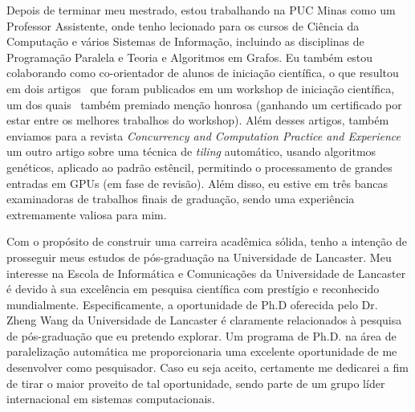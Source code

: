 \documentclass{article}
\begin{document}
Depois de terminar meu mestrado, estou trabalhando na PUC Minas como um
Professor Assistente, onde tenho lecionado para os cursos de Ci\^{e}ncia da
Computa\c{c}\~{a}o e v\'{a}rios Sistemas de Informa\c{c}\~{a}o, incluindo as
disciplinas de Programa\c{c}\~{a}o Paralela e Teoria e Algoritmos em Grafos. Eu
tamb\'{e}m estou colaborando como co-orientador de alunos de inicia\c{c}\~{a}o
cient\'{i}fica, o que resultou em dois
artigos~\cite{saffran2015apriori,pereira2015stencilbench} que foram publicados
em um workshop de inicia\c{c}\~{a}o cient\'{i}fica, um dos
quais~\cite{pereira2015stencilbench} tamb\'{e}m premiado men\c{c}\~{a}o honrosa
(ganhando um certificado por estar entre os melhores trabalhos do workshop).
Al\'{e}m desses artigos, tamb\'{e}m enviamos para a revista {\em Concurrency
and Computation Practice and Experience} um outro artigo sobre uma t\'{e}cnica
de {\em tiling} autom\'{a}tico, usando algoritmos gen\'{e}ticos, aplicado ao
padr\~{a}o est\^{e}ncil, permitindo o processamento de grandes entradas em GPUs
(em fase de revis\~{a}o).  Al\'{e}m disso, eu estive em tr\^{e}s bancas
examinadoras de trabalhos finais de gradua\c{c}\~{a}o, sendo uma
experi\^{e}ncia extremamente valiosa para mim.

Com o prop\'{o}sito de construir uma carreira acad\^{e}mica s\'{o}lida, tenho a
inten\c{c}\~{a}o de prosseguir meus estudos de p\'{o}s-gradua\c{c}\~{a}o na
Universidade de Lancaster. Meu interesse na Escola de Inform\'{a}tica e
Comunica\c{c}\~{o}es da Universidade de Lancaster \'{e} devido \`{a} sua
excel\^{e}ncia em pesquisa cient\'{i}fica com prest\'{i}gio e reconhecido
mundialmente. Especificamente, a oportunidade de Ph.D oferecida pelo Dr. Zheng
Wang da Universidade de Lancaster \'{e} claramente relacionados \`{a} pesquisa
de p\'{o}s-gradua\c{c}\~{a}o que eu pretendo explorar. Um programa de Ph.D.  na
\'{a}rea de paraleliza\c{c}\~{a}o autom\'{a}tica me proporcionaria uma
excelente oportunidade de me desenvolver como pesquisador.  Caso eu seja
aceito, certamente me dedicarei a fim de tirar o maior proveito de tal
oportunidade, sendo parte de um grupo l\'{i}der internacional em sistemas
computacionais.

\nocite{*}


\end{document}
